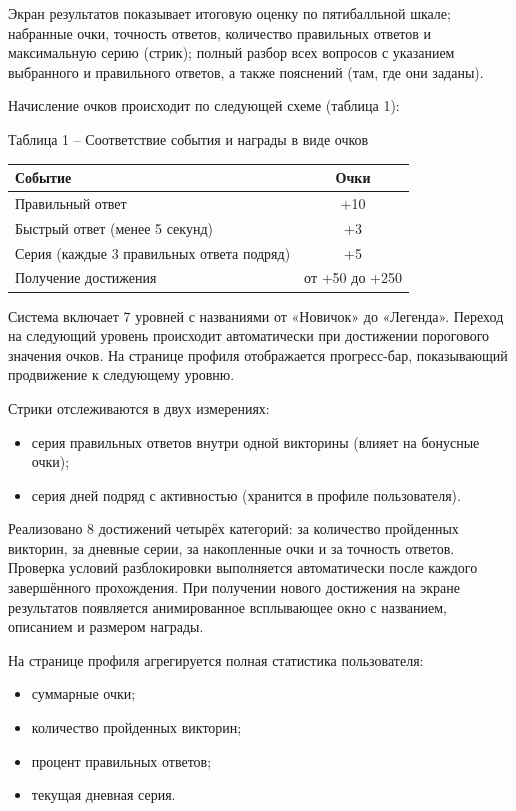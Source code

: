 \documentclass[14pt,a4paper]{extreport}
\begin{document}
Экран результатов показывает итоговую оценку по пятибалльной шкале; набранные очки, точность ответов, количество правильных ответов и максимальную серию (стрик); полный разбор всех вопросов с указанием выбранного и правильного ответов, а также пояснений (там, где они заданы).

Начисление очков происходит по следующей схеме (таблица 1):
\begin{center}
Таблица 1 -- Соответствие события и награды в виде очков
\end{center}
\begin{center}
\begin{tabular}{|l|c|}
\hline
\textbf{Событие} & \textbf{Очки} \\
\hline
Правильный ответ & +10 \\
Быстрый ответ (менее 5 секунд) & +3 \\
Серия (каждые 3 правильных ответа подряд) & +5 \\
Получение достижения & от +50 до +250 \\
\hline
\end{tabular}
\end{center}

Система включает 7 уровней с названиями от «Новичок» до «Легенда». Переход на следующий уровень происходит автоматически при достижении порогового значения очков. На странице профиля отображается прогресс-бар, показывающий продвижение к следующему уровню.

Стрики отслеживаются в двух измерениях:
\begin{itemize}
    \item серия правильных ответов внутри одной викторины (влияет на бонусные очки);
    \item серия дней подряд с активностью (хранится в профиле пользователя).
\end{itemize}

Реализовано 8 достижений четырёх категорий: за количество пройденных викторин, за дневные серии, за накопленные очки и за точность ответов. Проверка условий разблокировки выполняется автоматически после каждого завершённого прохождения. При получении нового достижения на экране результатов появляется анимированное всплывающее окно с названием, описанием и размером награды.

На странице профиля агрегируется полная статистика пользователя:
\begin{itemize}
    \item суммарные очки;
    \item количество пройденных викторин;
    \item процент правильных ответов;
    \item текущая дневная серия.
\end{itemize}
\end{document}
